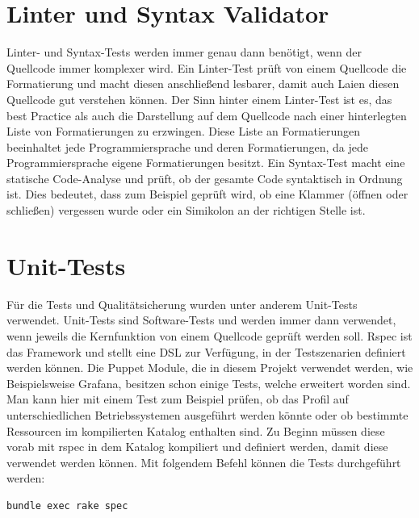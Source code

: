 {\section{Linter und Syntax Validator}
Linter- und Syntax\hyp{}Tests werden immer genau dann benötigt, wenn der
Quellcode immer komplexer wird. Ein Linter\hyp{}Test prüft von einem Quellcode
die Formatierung und macht diesen anschließend lesbarer, damit auch Laien
diesen Quellcode gut verstehen können. Der Sinn hinter einem Linter\hyp{}Test
ist es, das best Practice als auch die Darstellung auf dem Quellcode nach einer
hinterlegten Liste von Formatierungen zu erzwingen. Diese Liste an
Formatierungen beeinhaltet jede Programmiersprache und deren Formatierungen, da
jede Programmiersprache eigene Formatierungen besitzt. Ein Syntax\hyp{}Test
macht eine statische Code\hyp{}Analyse und prüft, ob der gesamte Code
syntaktisch in Ordnung ist. Dies bedeutet, dass zum Beispiel geprüft wird, ob
eine Klammer (öffnen oder schließen) vergessen wurde oder ein Simikolon an der
richtigen Stelle ist.
\mr%

\section{Unit-Tests}
\label{sec:unit_tests}
Für die Tests und Qualitätsicherung wurden unter anderem Unit-Tests verwendet.
Unit-Tests sind Software-Tests und werden immer dann verwendet, wenn jeweils
die Kernfunktion von einem Quellcode geprüft werden soll. Rspec ist das
Framework und stellt eine \gls{DSL} zur Verfügung, in der Testszenarien
definiert werden können. Die Puppet Module, die in diesem Projekt verwendet
werden, wie Beispielsweise Grafana, besitzen schon einige Tests, welche
erweitert worden sind. Man kann hier mit einem Test zum Beispiel prüfen, ob das
Profil auf unterschiedlichen Betriebssystemen ausgeführt werden könnte oder ob
bestimmte Ressourcen im kompilierten Katalog enthalten sind. Zu Beginn müssen
diese vorab mit rspec in dem Katalog kompiliert und definiert werden, damit
diese verwendet werden können. Mit folgendem Befehl können die Tests
durchgeführt werden:

\begin{verbatim}
bundle exec rake spec
\end{verbatim}

}
